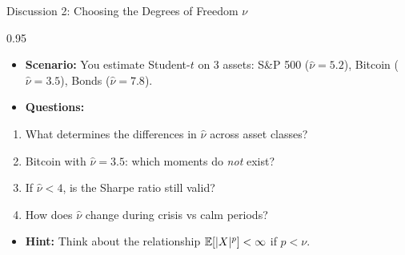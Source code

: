 \documentclass[9pt, aspectratio=169, t]{beamer}
\begin{document}
\begin{frame}{Discussion 2: Choosing the Degrees of Freedom $\nu$}
\begin{cminipage}{0.95\textwidth}
    \begin{itemize}\setlength{\itemsep}{0pt}
        \item \textbf{Scenario:} You estimate Student-$t$ on 3 assets: S\&P 500 ($\hat{\nu} = 5.2$), Bitcoin ($\hat{\nu} = 3.5$), Bonds ($\hat{\nu} = 7.8$).
        \item \textbf{Questions:}
    \end{itemize}
    \begin{enumerate}\setlength{\itemsep}{0pt}
        \item What determines the differences in $\hat{\nu}$ across asset classes?
        \item Bitcoin with $\hat{\nu} = 3.5$: which moments do \textit{not} exist?
        \item If $\hat{\nu} < 4$, is the Sharpe ratio still valid?
        \item How does $\hat{\nu}$ change during crisis vs calm periods?
    \end{enumerate}

    \vspace{0.3cm}
    \begin{itemize}\setlength{\itemsep}{0pt}
        \item \textbf{Hint:} Think about the relationship $\mathbb{E}[|X|^p] < \infty$ if $p < \nu$.
    \end{itemize}
\end{cminipage}
\end{frame}
\end{document}
